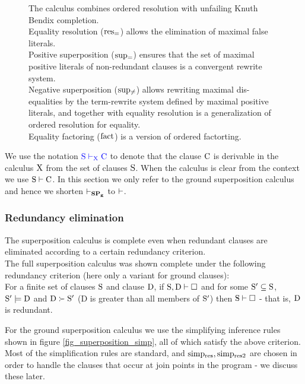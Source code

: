 \begin{figure}
{The calculus combines ordered resolution with unfailing Knuth Bendix completion.\\
Equality resolution ($\mathrm{res_{=}}$) allows the elimination of maximal false literals.\\
Positive superposition ($\mathrm{sup_{=}}$) ensures that the set of maximal positive literals of non-redundant clauses is a convergent rewrite system.\\
Negative superposition ($\mathrm{sup_{\neq}}$) allows rewriting maximal dis-equalities by the term-rewrite system defined by maximal positive literals, and together with equality resolution is a generalization of ordered resolution for equality.\\
Equality factoring ($\mathrm{fact}$) is a version of ordered factorting.
}
\label{fig_ground_superposition}
\end{figure}


\noindent
We use the notation $\textcolor{blue}{\mathrm{S \vdash_{X} C}}$ to denote that the clause $\mathrm{C}$ is derivable in the calculus $\mathrm{X}$ from the set of clauses $\mathrm{S}$. When the calculus is clear from the context we use $\mathrm{S \vdash C}$. In this section we only refer to the ground superposition calculus and hence we shorten $\mathrm{\vdash_{\mathbf{SP_{g}}}}$ to $\mathrm{\vdash}$.

\subsubsection*{Redundancy elimination}
The superposition calculus is complete even when redundant clauses are eliminated according to a certain redundancy criterion.\\
The full superposition calculus was shown complete under the following redundancy criterion (here only a variant for ground clauses):\\
For a finite set of clauses $\mathrm{S}$ and clause $\mathrm{D}$, 
if $\mathrm{S,D \vdash \square}$ and for some $\mathrm{S' \subseteq S}$, $\mathrm{S' \models D}$ and $\mathrm{D \succ S'}$ (D is greater than all members of $\mathrm{S'}$) then $\mathrm{S \vdash \square}$ - that is, $\mathrm{D}$ is redundant.

For the ground superposition calculus we use the simplifying inference rules shown in figure \ref{fig_superposition_simp}, all of which satisfy the above criterion. 
Most of the simplification rules are standard, and $\mathrm{simp_{res},simp_{res2}}$ are chosen in order to handle the clauses that occur at join points in the program - we discuss these later.

